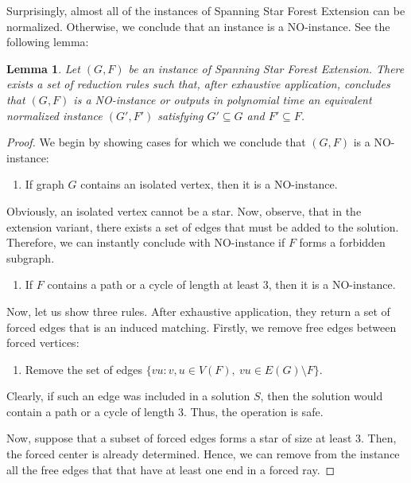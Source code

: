 \documentclass[en]{pracamgr}
\newtheorem{lemma}{Lemma}
\theoremstyle{definition}
\newcommand{\ssfep}{{\sc Spanning Star Forest Extension}}
\begin{document}
Surprisingly, almost all of the instances of \ssfep{} can be normalized. Otherwise, we conclude that an instance is a NO-instance. See the following lemma:

\begin{lemma}
	Let $(G,F)$ be an instance of \ssfep{}. There exists a set of reduction rules such that, after exhaustive application, concludes that $(G,F)$ is a NO-instance or outputs in polynomial time an equivalent normalized instance $(G',F')$ satisfying $G' \subseteq G$ and $F' \subseteq F$.
\end{lemma}

\begin{proof}
	We begin by showing cases for which we conclude that $(G,F)$ is a NO-instance:
	\begin{enumerate}[leftmargin=*,label=\textbf{Reduction \arabic{enumi}},labelindent=0pt]
		\item If graph $G$ contains an isolated vertex, then it is a NO-instance.
	\end{enumerate}
	
	Obviously, an isolated vertex cannot be a star. Now, observe, that in the extension variant, there exists a set of edges that must be added to the solution. Therefore, we can instantly conclude with NO-instance if $F$ forms a forbidden subgraph.
	
	\begin{enumerate}[leftmargin=*,label=\textbf{Reduction \arabic{enumi}},labelindent=0pt,resume]
		\item If $F$ contains a path or a cycle of length at least $3$, then it is a NO-instance.
	\end{enumerate}
	
	Now, let us show three rules. After exhaustive application, they return a set of forced edges that is an induced matching. Firstly, we remove free edges between forced vertices:	

	\begin{enumerate}[leftmargin=*,label=\textbf{Reduction \arabic{enumi}},labelindent=0pt,resume]
		\item Remove the set of edges $\{vu: v,u \in V(F),\ vu \in E(G) \setminus F\}$.
	\end{enumerate}
	Clearly, if such an edge was included in a solution $S$, then the solution would contain a path or a cycle of length $3$. Thus, the operation is safe. 
	
	Now, suppose that a subset of forced edges forms a star of size at least $3$. Then, the forced center is already determined. Hence, we can remove from the instance all the free edges that that have at least one end in a forced ray. 
	

\end{proof}
\end{document}
